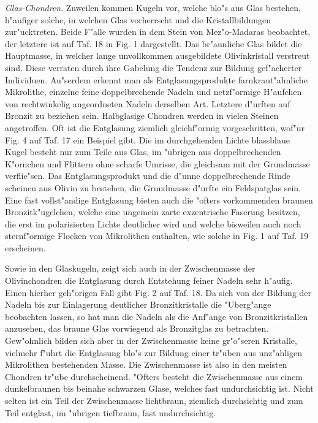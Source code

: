 \documentclass[a4paper, 11pt, oneside, polutonikogreek, german]{article}
\begin{document}
\emph{Glas-Chondren}. Zuweilen kommen Kugeln vor, welche blo"s aus Glas bestehen, h"aufiger solche, in welchen Glas vorherrscht und die Kristallbildungen zur"ucktreten. Beide F"alle wurden in dem Stein von Mez"o-Madaras beobachtet, der letztere ist auf Taf. 18 in Fig. 1 dargestellt. Das br"aunliche Glas bildet die Hauptmasse, in welcher lange unvollkommen ausgebildete Olivinkristall verstreut sind. Diese verraten durch ihre Gabelung die Tendenz zur Bildung gef"acherter Individuen. Au"serdem erkennt man als Entglasungsprodukte farnkraut"ahnliche Mikrolithe, einzelne feine doppelbrechende Nadeln und netzf"ormige H"aufchen von rechtwinkelig angeordneten Nadeln derselben Art. Letztere d"urften auf Bronzit zu beziehen sein. Halbglasige Chondren werden in vielen Steinen angetroffen. Oft ist die Entglasung ziemlich gleichf"ormig vorgeschritten, wof"ur Fig. 4 auf Taf. 17 ein Beispiel gibt. Die im durchgehenden Lichte blassblaue Kugel besteht nur zum Teile aus Glas, im "ubrigen aus doppelbrechenden K"ornchen und Flittern ohne scharfe Umrisse, die gleichsam mit der Grundmasse verflie"sen. Das Entglasungsprodukt und die d"unne doppelbrechende Rinde scheinen aus Olivin zu bestehen, die Grundmasse d"urfte ein Feldspatglas sein. Eine fast vollst"andige Entglasung bieten auch die "ofters vorkommenden braunen Bronzitk"ugelchen, welche eine ungemein zarte exzentrische Faserung besitzen, die erst im polarisierten Lichte deutlicher wird und welche bisweilen auch noch sternf"ormige Flocken von Mikrolithen enthalten, wie solche in Fig. 1 auf Taf. 19 erscheinen.

Sowie in den Glaskugeln, zeigt sich auch in der Zwischenmasse der Olivinchondren die Entglasung durch Entstehung feiner Nadeln sehr h"aufig. Einen hierher geh"origen Fall gibt Fig. 2 auf Taf. 18. Da sich von der Bildung der Nadeln bis zur Einlagerung deutlicher Bronzitkristalle die "Uberg"ange beobachten lassen, so hat man die Nadeln als die Anf"ange von Bronzitkristallen anzusehen, das braune Glas vorwiegend als Bronzitglas zu betrachten. Gew"ohnlich bilden sich aber in der Zwischenmasse keine gr"o"seren Kristalle, vielmehr f"uhrt die Entglasung blo"s zur Bildung einer tr"uben aus unz"ahligen Mikrolithen bestehenden Masse. Die Zwischenmasse ist also in den meisten Chondren tr"ube durchscheinend. "Ofters besteht die Zwischenmasse aus einem dunkelbraunen bis beinahe schwarzen Glase, welches fast undurchsichtig ist. Nicht selten ist ein Teil der Zwischenmasse lichtbraun, ziemlich durchsichtig und zum Teil entglast, im "ubrigen tiefbraun, fast undurchsichtig.
\end{document}
